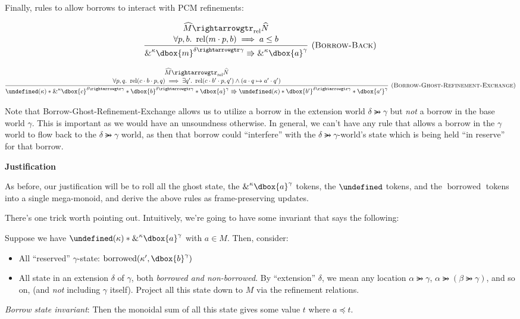 \documentclass{article}
\newcommand{\einfer}[3]
        {\infer[(\textsc{#1})]{#3}{#2}}
\newcommand{\stacktwo}[2]{\stackanchor{\ensuremath{#1}}{\ensuremath{#2}}}
\newcommand\dboxed[1]{\dbox{\vphantom{t}\ensuremath{#1}}}
\newcommand{\viewshift}{\Rrightarrow}
\DeclareMathOperator{\rel}{rel}
\newcommand{\borrow}[2]{\textsc{\&}^{#1}#2}
\newcommand{\refines}{\rightarrowgtr}
\DeclareMathOperator{\borrowed}{borrowed}
\let\active\undefined
\DeclareMathOperator{\active}{active}
\begin{document}
Finally, rules to allow borrows to interact with PCM refinements:

\[
  \einfer{Borrow-Back}{
    \stacktwo{
      \widehat{M} \refines_{\rel} \widehat{N}
    }{
      \forall p, b .~ \rel(m \cdot p, b) \implies a \le b
    }
  }{
    \borrow{\kappa}{\dboxed{m}^{\delta \refines \gamma}} \viewshift \borrow{\kappa}{\dboxed{a}^\gamma}
  }
\]

\[
  \einfer{Borrow-Ghost-Refinement-Exchange}{
    \stacktwo{
      \widehat{M} \refines_{\rel} \widehat{N}
    }{
      \forall p,q.~ \rel(c\cdot b\cdot p, q) \implies \exists q' .~ \rel(c \cdot b' \cdot p, q') \land (a \cdot q \mapsto a' \cdot q')
    }
  }{
    \active(\kappa) *
    \borrow{\kappa}{\dboxed{c}^{\delta\refines\gamma}} *
    \dboxed{b}^{\delta\refines\gamma} * \dboxed{a}^\gamma
      \viewshift
    \active(\kappa) *
    \dboxed{b'}^{\delta\refines\gamma} * \dboxed{a'}^\gamma
  }
\]


Note that Borrow-Ghost-Refinement-Exchange allows us to utilize a borrow in the extension world $\delta \refines \gamma$ but \emph{not} a borrow in the base world $\gamma$. This is important as we would have an unsoundness otherwise. In general, we can't have any rule that allows a borrow in the $\gamma$ world to flow back to the $\delta \refines \gamma$ world, as then that borrow could ``interfere'' with the $\delta\refines\gamma$-world's state which is being held ``in reserve'' for that borrow.

\textbf{Justification}

As before, our justification will be to roll all the ghost state, the $\borrow{\kappa}{\dboxed{a}^\gamma}$ tokens, the $\active$ tokens, and the $\borrowed$
tokens into a single mega-monoid, and derive the above rules as frame-preserving updates.

There's one trick worth pointing out. Intuitively, we're going to have some invariant
that says the following:

Suppose we have $\active(\kappa) * \borrow{\kappa}{\dboxed{a}^\gamma}$ with $a \in M$. Then, consider:
\begin{itemize}
  \item All ``reserved'' $\gamma$-state: $\borrowed(\kappa', \dboxed{b}^\gamma)$
  \item All state in an extension $\delta$ of $\gamma$, both \emph{borrowed and non-borrowed}.
        By ``extension'' $\delta$, we mean any location $\alpha \refines \gamma$,
        $\alpha \refines (\beta \refines \gamma)$, and so on, (and \emph{not} including $\gamma$ itself).
        Project all this state down to $M$ via the refinement relations.
\end{itemize}
\emph{Borrow state invariant}: Then the monoidal sum of all this state gives some value $t$ where $a \preceq t$.
\end{document}
